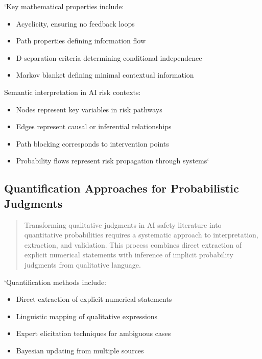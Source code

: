 \documentclass[12pt,a4paper]{report}
\providecommand{\tightlist}{%
  \setlength{\itemsep}{0pt}\setlength{\parskip}{0pt}}
\begin{document}
`Key mathematical properties include:

\begin{itemize}
\tightlist
\item
  Acyclicity, ensuring no feedback loops
\item
  Path properties defining information flow
\item
  D-separation criteria determining conditional independence
\item
  Markov blanket defining minimal contextual information
\end{itemize}

Semantic interpretation in AI risk contexts:

\begin{itemize}
\tightlist
\item
  Nodes represent key variables in risk pathways
\item
  Edges represent causal or inferential relationships
\item
  Path blocking corresponds to intervention points
\item
  Probability flows represent risk propagation through systems`
\end{itemize}

\subsection{Quantification Approaches for Probabilistic
Judgments}\label{sec-quantification-approaches}

\begin{quote}
Transforming qualitative judgments in AI safety literature into
quantitative probabilities requires a systematic approach to
interpretation, extraction, and validation. This process combines direct
extraction of explicit numerical statements with inference of implicit
probability judgments from qualitative language.
\end{quote}

`Quantification methods include:

\begin{itemize}
\tightlist
\item
  Direct extraction of explicit numerical statements
\item
  Linguistic mapping of qualitative expressions
\item
  Expert elicitation techniques for ambiguous cases
\item
  Bayesian updating from multiple sources
\end{itemize}
\end{document}
